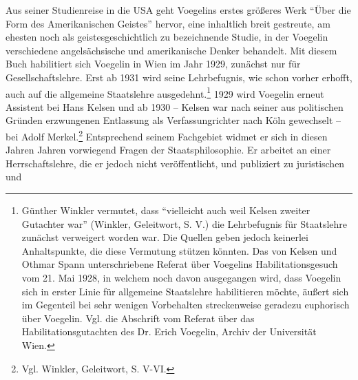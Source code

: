\documentclass[12pt,a4paper,ngerman]{article}
\begin{document}
Aus seiner Studienreise in die USA geht Voegelins erstes größeres Werk "`Über
die Form des Amerikanischen Geistes"' hervor, eine inhaltlich breit gestreute,
am ehesten noch als geistesgeschichtlich zu bezeichnende Studie, in der
Voegelin verschiedene angelsächsische und amerikanische Denker behandelt.
Mit diesem Buch habilitiert sich Voegelin in Wien im Jahr 1929,
zunächst nur für Gesellschaftslehre. Erst ab 1931 wird seine
Lehrbefugnis, wie schon vorher erhofft, auch auf die allgemeine
Staatslehre ausgedehnt.\footnote{Günther Winkler vermutet, dass
  "`vielleicht auch weil Kelsen zweiter Gutachter war"' (Winkler,
  Geleitwort, S. V.) die Lehrbefugnis für Staatslehre zunächst
  verweigert worden war. Die Quellen geben jedoch keinerlei
  Anhaltspunkte, die diese Vermutung stützen könnten. Das von Kelsen
  und Othmar Spann unterschriebene Referat über Voegelins
  Habilitationsgesuch vom 21. Mai 1928, in welchem noch davon
  ausgegangen wird, dass Voegelin sich in erster Linie für allgemeine
  Staatslehre habilitieren möchte, äußert sich im Gegenteil bei sehr
  wenigen Vorbehalten streckenweise geradezu euphorisch über Voegelin.
  Vgl. die Abschrift vom Referat über das Habilitationsgutachten des
  Dr. Erich Voegelin, Archiv der Universität Wien.} 1929 wird Voegelin
erneut Assistent bei Hans Kelsen und ab 1930 -- Kelsen war nach seiner
aus politischen Gründen erzwungenen Entlassung als Verfassungrichter
nach Köln gewechselt -- bei Adolf Merkel.\footnote{Vgl. Winkler,
  Geleitwort, S. V-VI.} Entsprechend seinem Fachgebiet widmet er sich
in diesen Jahren Jahren vorwiegend Fragen der Staatsphilosophie. Er
arbeitet an einer Herrschaftslehre, die er jedoch nicht
veröffentlicht, und publiziert zu juristischen und
\end{document}

